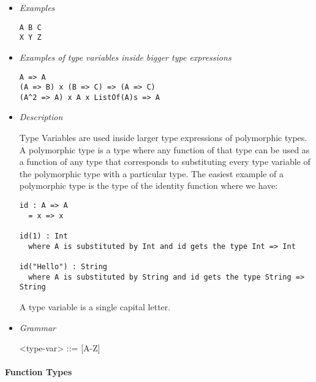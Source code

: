\documentclass{article}
\begin{document}
\begin{itemize}
\item \textit{Examples}
\begin{verbatim}
A B C
X Y Z
\end{verbatim}

\item \textit{Examples of type variables inside bigger type expressions}
\begin{verbatim}
A => A
(A => B) x (B => C) => (A => C)
(A^2 => A) x A x ListOf(A)s => A
\end{verbatim}

\item \textit{Description}

Type Variables are used inside larger type expressions of polymorphic types. A
polymorphic type is a type where any function of that type can be used as a
function of any type that corresponds to substituting every type variable of
the polymorphic type with a particular type. The easiest example of a
polymorphic type is the type of the identity function where we have:
\begin{verbatim}
id : A => A
  = x => x

id(1) : Int
  where A is substituted by Int and id gets the type Int => Int

id("Hello") : String
  where A is substituted by String and id gets the type String => String
\end{verbatim}

A type variable is a single capital letter.

\item \textit{Grammar}
\begin{grammar}
<type-var> ::= [A-Z] \\ 
\end{grammar}
\end{itemize}

\paragraph{Function Types}
\end{document}
